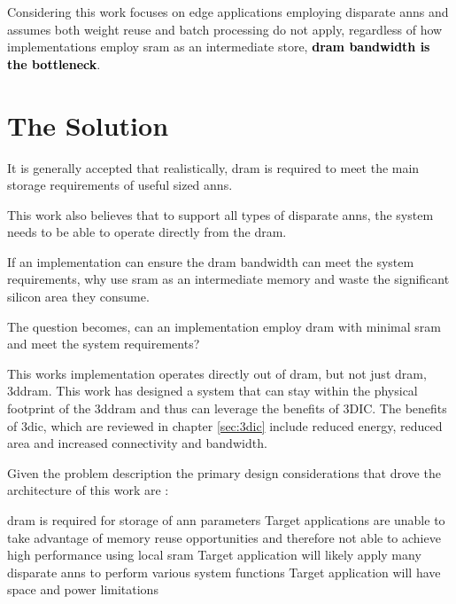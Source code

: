 Considering this work focuses on edge applications employing disparate \ac{ann}s and assumes both weight reuse and batch processing do not apply, regardless of how implementations employ \ac{sram} as an intermediate store, \textbf{\textcolor{black}{\ac{dram} bandwidth is the bottleneck}}.



\iffalse How this work addresses the problem are outlined in section \ref{chap-five}. \fi


\section[The Solution]{The Solution}
\label{sec:The Solution}

It is generally accepted that realistically, \ac{dram} is required to meet the main storage requirements of useful sized \ac{ann}s.

This work also believes that to support all types of disparate \ac{ann}s, the system needs to be able to operate directly from the \ac{dram}.
\iffalse 
This is because SRAM-based solutions assume memory reuse when processing a \ac{ann}.
However, when \ac{ann}s do not provide sufficient reuse these solutions become \ac{dram} bandwidth bound. 
\fi

If an implementation can ensure the \ac{dram} bandwidth can meet the system requirements, why use \ac{sram} as an intermediate memory and waste the significant silicon area they consume.

The question becomes, can an implementation employ \ac{dram} with minimal \ac{sram} and meet the system requirements?

This works implementation operates directly out of \ac{dram}, but not just \ac{dram}, \ac{3ddram}.
This work has designed a system that can stay within the physical footprint of the \ac{3ddram} and thus can leverage the benefits of 3DIC.
The benefits of \ac{3dic}, which are reviewed in chapter \ref{sec:3dic} include reduced energy, reduced area and increased connectivity and bandwidth.

\iffalse
Therefore, this work is able to propose a custom 3D-\ac{dram} that exposes more of the \ac{dram}s internal page and thus generates interface bandwidth that is of the order of 64 times that of the standard \ac{3ddram}.
\fi

Given the problem description \iffalse outlined in section \ref{sec:The Problem},\fi the primary design considerations that drove the architecture of this work are :
\begin{outline}
  \1 \ac{dram} is required for storage of \ac{ann} parameters 
  \1 Target applications are unable to take advantage of memory reuse opportunities and therefore not able to achieve high performance using local \ac{sram} \iffalse to store \ac{ann} parameters or the \ac{ann} input \fi
  \1 Target application will likely apply many disparate \acp{ann} to perform various system functions
  \1 Target application will have space and power limitations
\end{outline}

